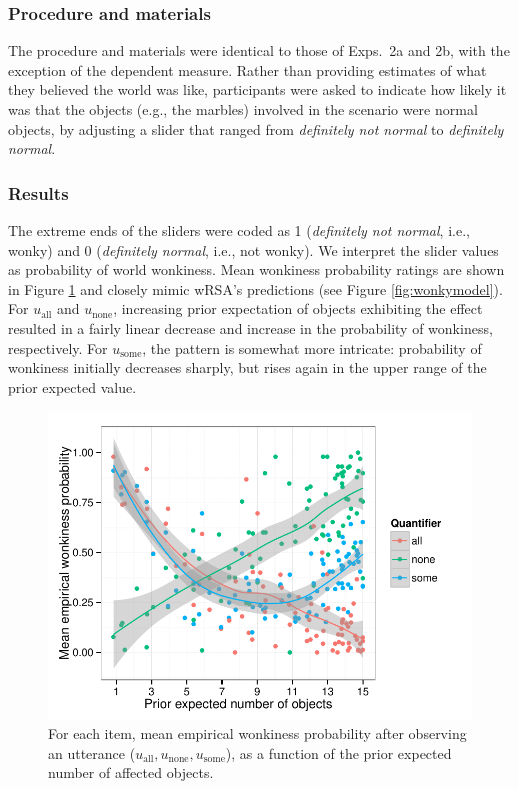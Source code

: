 \documentclass[10pt,letterpaper]{article}
\newcommand{\figref}[1]{Figure \ref{#1}}
\begin{document}
\subsubsection{Procedure and materials}

The procedure and materials were identical to those of Exps.~2a and 2b, with the exception of the dependent measure. Rather than providing estimates of what they believed the world was like, participants were asked to indicate how likely it was that the objects  (e.g., the marbles) involved in the scenario were normal objects, by adjusting a slider that ranged from \emph{definitely not normal} to \emph{definitely normal}.

\subsubsection{Results}

The extreme ends of the sliders were coded as 1 (\emph{definitely not normal}, i.e., wonky) and 0 (\emph{definitely normal}, i.e., not wonky). We interpret the slider values as probability of world wonkiness. Mean wonkiness probability ratings are shown in \figref{fig:wonkyratings} and closely mimic wRSA's predictions (see \figref{fig:wonkymodel}). For $u_{\textrm{all}}$ and $u_{\textrm{none}}$, increasing prior expectation of objects exhibiting the effect resulted in a fairly linear decrease and increase in the probability of wonkiness, respectively. For $u_{\textrm{some}}$, the pattern is somewhat more intricate: probability of wonkiness initially decreases sharply, but rises again in the upper range of the prior expected value. 

\begin{figure}
	\includegraphics[width=.5\textwidth]{pics/empirical-wonkiness}
	\caption{For each item, mean empirical wonkiness probability after observing an utterance ($u_{\textrm{all}}, u_{\textrm{none}}, u_{\textrm{some}}$), as a function of the prior expected  number of affected objects.}
	\label{fig:wonkyratings}	
\end{figure}
\end{document}
